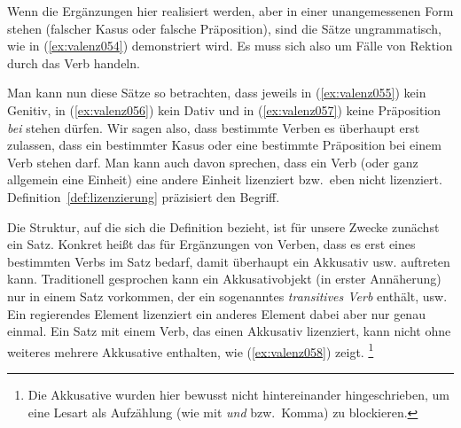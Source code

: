 \begin{exe}
  \ex\label{ex:valenz050}
  \begin{xlist}
  \end{xlist}
\end{exe}

Wenn die Ergänzungen hier realisiert werden, aber in einer unangemessenen Form stehen (falscher Kasus oder falsche Präposition), sind die Sätze ungrammatisch, wie in (\ref{ex:valenz054}) demonstriert wird.
Es muss sich also um Fälle von Rektion durch das Verb handeln.

\begin{exe}
  \ex\label{ex:valenz054}
  \begin{xlist}
  \end{xlist}
\end{exe}

Man kann nun diese Sätze so betrachten, dass jeweils in (\ref{ex:valenz055}) kein Genitiv, in (\ref{ex:valenz056}) kein Dativ und in (\ref{ex:valenz057}) keine Präposition \textit{bei} stehen dürfen.
Wir sagen also, dass bestimmte Verben es überhaupt erst zulassen, dass ein bestimmter Kasus oder eine bestimmte Präposition bei einem Verb stehen darf.
Man kann auch davon sprechen, dass ein Verb (oder ganz allgemein eine Einheit) eine andere Einheit lizenziert bzw.\ eben nicht lizenziert.
Definition~\ref{def:lizenzierung} präzisiert den Begriff.


Die Struktur, auf die sich die Definition bezieht, ist für unsere Zwecke zunächst ein Satz.
Konkret heißt das \zB für Ergänzungen von Verben, dass es erst eines bestimmten Verbs im Satz bedarf, damit überhaupt ein Akkusativ usw. auftreten kann.
Traditionell gesprochen kann ein Akkusativobjekt (in erster Annäherung) nur in einem Satz vorkommen, der ein sogenanntes \textit{transitives Verb} enthält, usw.
Ein regierendes Element lizenziert ein anderes Element dabei aber nur genau einmal.
Ein Satz mit einem Verb, das einen Akkusativ lizenziert, kann nicht ohne weiteres mehrere Akkusative enthalten, wie (\ref{ex:valenz058}) zeigt.%
\footnote{Die Akkusative wurden hier bewusst nicht hintereinander hingeschrieben, um eine Lesart als Aufzählung (wie mit \textit{und} bzw.\ Komma) zu blockieren.}

